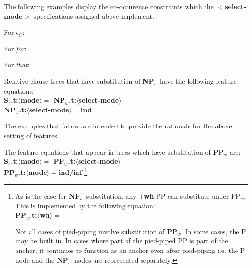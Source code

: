 The following examples display the co-occurence constraints which 
the {\bf $<$select-mode$>$} specifications assigned above implement.

For $\epsilon$$_{C}$:

For {\em for}:

For {\em that}:

Relative clause trees that have substitution of {\bf NP$_{w}$} have
the following feature equations:\\
{\bf S$_{r}$.t:$\langle$mode$\rangle =$ NP$_{w}$.t:$\langle$select-mode$\rangle$}\\
{\bf NP$_{w}$.t:$\langle$select-mode$\rangle =$ind}

The examples that follow are intended to provide the rationale for 
the above setting of features.

The feature equations that appear in trees which have substitution of 
{\bf PP$_{w}$} are:\\
{\bf S$_{r}$.t:$\langle$mode$\rangle =$ PP$_{w}$.t:$\langle$select-mode$\rangle$}\\
{\bf PP$_{w}$.t:$\langle$mode$\rangle =$ind/inf} \footnote{As is the case for
{\bf NP$_{w}$} substitution, any  $+${\bf wh}-PP can substitute under PP$_{w}$.
This is implemented by the following equation:\\
{\bf PP$_{w}$.t:$\langle$wh$\rangle = +$}

Not all cases of pied-piping involve substitution of {\bf PP$_{w}$}.
In some cases, the P may be built in. In cases where part of the pied-piped
PP is part of the anchor, it continues to function as an anchor even after
pied-piping i.e. the P node and the {\bf NP$_{w}$} nodes are represented
separately.
}

